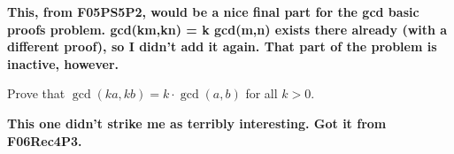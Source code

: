 \documentclass[handout]{mcs}
\begin{document}






\iffalse



\large\textbf{This, from F05PS5P2, would be a nice final part for the gcd basic proofs problem.
gcd(km,kn) = k gcd(m,n) exists there already (with a different proof), so I 
didn't add it again.  That part of the problem is inactive, however.}

\begin{problem}
Prove that $\gcd(ka, kb) = k \cdot \gcd(a, b)$ for all $k > 0$.

\end{problem}


\large\textbf{This one didn't strike me as terribly interesting.  Got it from F06Rec4P3.}
\end{document}

